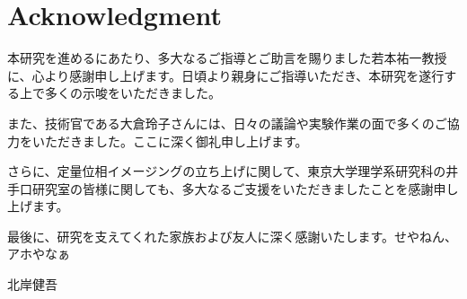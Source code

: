 \chapter*{Acknowledgment}
本研究を進めるにあたり、多大なるご指導とご助言を賜りました若本祐一教授に、心より感謝申し上げます。日頃より親身にご指導いただき、本研究を遂行する上で多くの示唆をいただきました。

また、技術官である大倉玲子さんには、日々の議論や実験作業の面で多くのご協力をいただきました。ここに深く御礼申し上げます。

さらに、定量位相イメージングの立ち上げに関して、東京大学理学系研究科の井手口研究室の皆様に関しても、多大なるご支援をいただきましたことを感謝申し上げます。

最後に、研究を支えてくれた家族および友人に深く感謝いたします。せやねん、アホやなぁ
\begin{flushright}
	 北岸健吾
\end{flushright}
